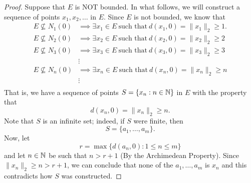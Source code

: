 \documentclass[a4paper]{report}
\begin{document}
\begin{proof}
Suppose that \( E  \) is NOT bounded. In what follows, we will construct a sequence of points \( {x}_{1}, {x}_{2}, \dots  \) in \( E  \). Since \( E  \) is not bounded, we know that 
\begin{align*}  E \not\subseteq {N}_{1}(0) &\implies \exists {x}_{1} \in E \ \text{such that}  \ d({x}_{1}, 0) = \|{x}_{1}\|_2 \geq 1. \\  
    E \not\subseteq {N}_{2}(0) &\implies \exists {x}_{2} \in E \ \text{such that} \ d({x}_{2}, 0) = \|{x}_{2}\|_{2} \geq 2 \\
    E \not\subseteq {N}_{3}(0) &\implies \exists {x}_{3} \in E \ \text{such that} \ d({x}_{3}, 0) = \|{x}_{3}\|_2 \geq 3 \\
                               &\vdots \\
    E \not\subseteq {N}_{n}(0) &\implies \exists {x}_{n} \in E \ \text{such that} \ d({x}_{n}, 0) = \|{x}_{n}\|_2 \geq n \\
                               &\vdots \\
\end{align*}
That is, we have a sequence of points \( S = \{ {x}_{n} : n \in \mathbb{N}  \}    \) in \( E  \) with the property that 
\[  d({x}_{n}, 0) = \|{x}_{n}\|_2 \geq n. \]
Note that \( S  \) is an infinite set; indeed, if \( S  \) were finite, then
\[  S = \{ {a}_{1}, \dots, {a}_{m} \}. \]
Now, let 
\[  r = \max \{ d({a}_{n},0) : 1 \leq n \leq m \} \]
and let \( n \in \mathbb{N}  \) be such that \( n > r + 1  \) (By the Archimedean Property). Since \( \|{x}_{n}\|_2 \geq n  > r + 1  \), we can conclude that none of the \( {a}_{1}, \dots, {a}_{m} \) is \( {x}_{n} \) and this contradicts how \( S  \) was constructed.


\end{proof}
\end{document}
